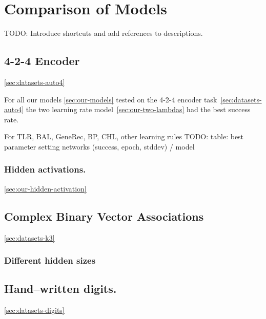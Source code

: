 
\section{Comparison of Models} 
\label{sec:results-comparison}

TODO: Introduce shortcuts and add references to descriptions. \\

\subsection{4-2-4 Encoder}
\ref{sec:datasets-auto4} 

For all our models \ref{sec:our-models} tested on the 4-2-4 encoder task~\ref{sec:datasets-auto4} the two learning rate model~\ref{sec:our-two-lambdas} had the best success rate. 

For TLR, BAL, GeneRec, BP, CHL, other learning rules
TODO: table: best parameter setting networks (success, epoch, stddev) / model \\

\subsubsection{Hidden activations.}
\ref{sec:our-hidden-activation}  


\subsection{Complex Binary Vector Associations}
\ref{sec:datasets-k3} 


\subsubsection{Different hidden sizes} 

\subsection{Hand--written digits.}
\ref{sec:datasets-digits} 

